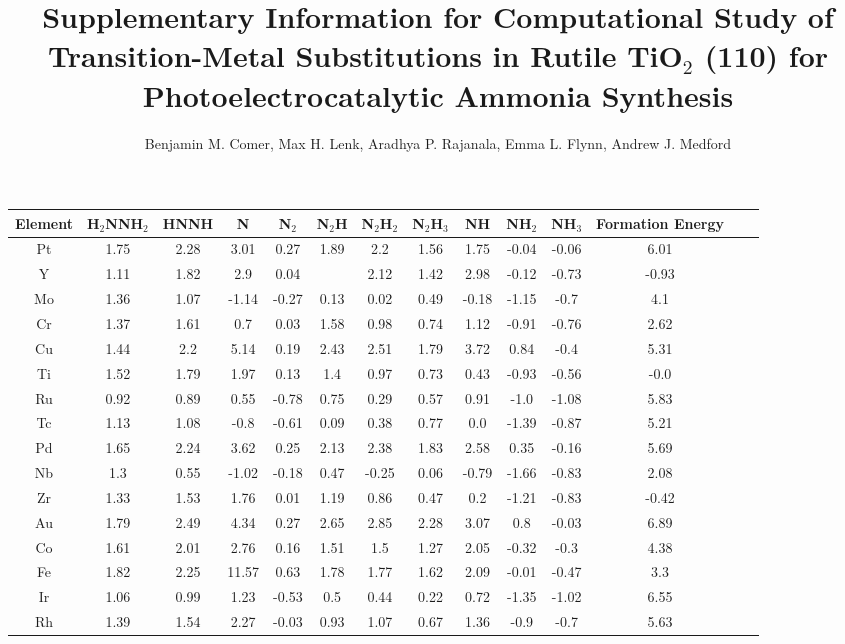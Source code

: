 \documentclass{article}
\title{\TitleFont Supplementary Information for Computational Study of Transition-Metal Substitutions in Rutile TiO$_2$ (110) for Photoelectrocatalytic Ammonia Synthesis}
\author{Benjamin M. Comer, Max H. Lenk, Aradhya P. Rajanala, Emma L. Flynn, Andrew J. Medford}
\begin{document}
\maketitle\begin{table}
\setlength\tabcolsep{2pt}
\begin{center}
\begin{tabular}{| c | c | c | c | c | c | c | c | c | c | c | c | c | c |}
\hline
Element & H$_2$NNH$_2$ & HNNH & N & N$_2$ & N$_2$H & N$_2$H$_2$ & N$_2$H$_3$ & NH & NH$_2$ & NH$_3$ & Formation Energy\\
\hline

Pt & 1.75 & 2.28 & 3.01 & 0.27 & 1.89 & 2.2 & 1.56 & 1.75 & -0.04 & -0.06 & 6.01 \\
Y & 1.11 & 1.82 & 2.9 & 0.04 &  & 2.12 & 1.42 & 2.98 & -0.12 & -0.73 & -0.93 \\
Mo & 1.36 & 1.07 & -1.14 & -0.27 & 0.13 & 0.02 & 0.49 & -0.18 & -1.15 & -0.7 & 4.1 \\
Cr & 1.37 & 1.61 & 0.7 & 0.03 & 1.58 & 0.98 & 0.74 & 1.12 & -0.91 & -0.76 & 2.62 \\
Cu & 1.44 & 2.2 & 5.14 & 0.19 & 2.43 & 2.51 & 1.79 & 3.72 & 0.84 & -0.4 & 5.31 \\
Ti & 1.52 & 1.79 & 1.97 & 0.13 & 1.4 & 0.97 & 0.73 & 0.43 & -0.93 & -0.56 & -0.0 \\
Ru & 0.92 & 0.89 & 0.55 & -0.78 & 0.75 & 0.29 & 0.57 & 0.91 & -1.0 & -1.08 & 5.83 \\
Tc & 1.13 & 1.08 & -0.8 & -0.61 & 0.09 & 0.38 & 0.77 & 0.0 & -1.39 & -0.87 & 5.21 \\
Pd & 1.65 & 2.24 & 3.62 & 0.25 & 2.13 & 2.38 & 1.83 & 2.58 & 0.35 & -0.16 & 5.69 \\
Nb & 1.3 & 0.55 & -1.02 & -0.18 & 0.47 & -0.25 & 0.06 & -0.79 & -1.66 & -0.83 & 2.08 \\
Zr & 1.33 & 1.53 & 1.76 & 0.01 & 1.19 & 0.86 & 0.47 & 0.2 & -1.21 & -0.83 & -0.42 \\
Au & 1.79 & 2.49 & 4.34 & 0.27 & 2.65 & 2.85 & 2.28 & 3.07 & 0.8 & -0.03 & 6.89 \\
Co & 1.61 & 2.01 & 2.76 & 0.16 & 1.51 & 1.5 & 1.27 & 2.05 & -0.32 & -0.3 & 4.38 \\
Fe & 1.82 & 2.25 & 11.57 & 0.63 & 1.78 & 1.77 & 1.62 & 2.09 & -0.01 & -0.47 & 3.3 \\
Ir & 1.06 & 0.99 & 1.23 & -0.53 & 0.5 & 0.44 & 0.22 & 0.72 & -1.35 & -1.02 & 6.55 \\
Rh & 1.39 & 1.54 & 2.27 & -0.03 & 0.93 & 1.07 & 0.67 & 1.36 & -0.9 & -0.7 & 5.63 \\

\end{tabular}
\end{center}
\end{table}
\end{document}
